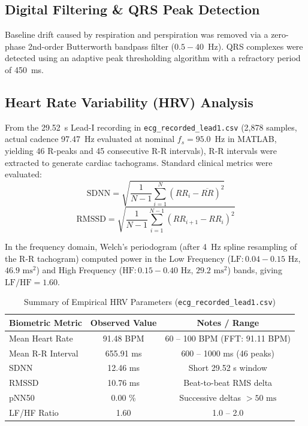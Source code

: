 \documentclass[journal,10pt,twocolumn]{IEEEtran}
\begin{document}
\subsection{Digital Filtering \& QRS Peak Detection}
Baseline drift caused by respiration and perspiration was removed via a zero-phase 2nd-order Butterworth bandpass filter ($0.5 - 40$~Hz). QRS complexes were detected using an adaptive peak thresholding algorithm with a refractory period of 450~ms.

\subsection{Heart Rate Variability (HRV) Analysis}
From the 29.52~s Lead-I recording in \texttt{ecg\_recorded\_lead1.csv} (2,878 samples, actual cadence 97.47~Hz evaluated at nominal $f_s = 95.0$~Hz in MATLAB, yielding 46 R-peaks and 45 consecutive R-R intervals), R-R intervals were extracted to generate cardiac tachograms. Standard clinical metrics were evaluated:
\begin{equation}
\text{SDNN} = \sqrt{\frac{1}{N-1}\sum_{i=1}^N (RR_i - \overline{RR})^2}
\end{equation}
\begin{equation}
\text{RMSSD} = \sqrt{\frac{1}{N-1}\sum_{i=1}^{N-1} (RR_{i+1} - RR_i)^2}
\end{equation}

In the frequency domain, Welch's periodogram (after 4~Hz spline resampling of the R-R tachogram) computed power in the Low Frequency ($\text{LF}: 0.04-0.15\text{ Hz}$, $46.9\text{ ms}^2$) and High Frequency ($\text{HF}: 0.15-0.40\text{ Hz}$, $29.2\text{ ms}^2$) bands, giving $\text{LF/HF} = 1.60$.

\begin{table}[h]
\centering
\caption{Summary of Empirical HRV Parameters (\texttt{ecg\_recorded\_lead1.csv})}
\begin{tabular}{lcc}
\toprule
\textbf{Biometric Metric} & \textbf{Observed Value} & \textbf{Notes / Range} \\
\midrule
Mean Heart Rate & 91.48 BPM & 60 -- 100 BPM (FFT: 91.11 BPM) \\
Mean R-R Interval & 655.91 ms & 600 -- 1000 ms (46 peaks) \\
SDNN & 12.46 ms & Short 29.52 s window \\
RMSSD & 10.76 ms & Beat-to-beat RMS delta \\
pNN50 & 0.00 \% & Successive deltas $> 50\text{ ms}$ \\
LF/HF Ratio & 1.60 & 1.0 -- 2.0 \\
\bottomrule
\end{tabular}
\end{table}
\end{document}
